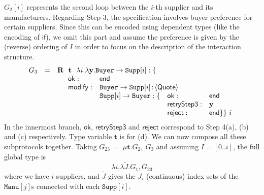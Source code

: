 \documentclass{LMCS}
\newcommand{\kf}[1]{\textup{\textsf{#1}}\xspace}
\newcommand{\RECSEQP}[4]{\ensuremath{\mathbf{R} \ #1\ \lambda #2.\lambda #3.#4}}
\newcommand{\ty}{\textbf{t}}
\newcommand{\End}{\kf{end}}
\newcommand{\ENCan}[1]{\langle #1 \rangle}
\newcommand{\TO}[2]{#1\to #2}
\newcommand{\GS}[3]{\TO{#1}{#2}\colon \!\ENCan{#3}}
\newcommand{\GR}[4]{\RECSEQP{#1}{#2}{#3}{#4}}
\newcommand{\GM}[2]{\mu #1.#2}
\newcommand{\ii}{\ensuremath{i}}
\newcommand{\jj}{\ensuremath{j}}
\newcommand{\yy}{\ensuremath{\mathbf{y}}}
\newcommand{\II}{\ensuremath{I}}
\newcommand{\VEC}{\tilde}
\newcommand{\MERGE}[1]{\ensuremath{#1}}
\begin{document}
\noindent
$G_2[i]$ represents the second loop between the $i$-th supplier and its
manufacturers.  
Regarding {\sc Step} 3,  
the specification involves buyer preference for certain suppliers.  
Since this can be encoded using dependent types 
(like the encoding of $\mathsf{if}$),
we omit this part and assume 
the preference is given by the (reverse) ordering of $\II$ in order to focus on the
description of the
interaction structure.
\[
\begin{array}{rcl}
G_3 & = & \GR{\ \ty\ }{i}{\yy}{} \TO{\texttt{Buyer}}{\texttt{Supp}[i]} : \{ \\
& & \quad \begin{array}{llll}
\mathsf{ok}: & \End \\
\mathsf{modify}: & \multicolumn{3}{l}{\GS{\texttt{Buyer}}{\texttt{Supp}[i]}{\mathsf{Quote}}} \\
& \TO{\texttt{Supp}[i]}{\texttt{Buyer}}: \{
&  \mathsf{ok}: & \End \\
&& \mathsf{retryStep3}: & \yy\\
&&  \mathsf{reject}: & \End\}\}\ \ii
\end{array}
\end{array}
\]
In the innermost branch, $\mathsf{ok}$, $\mathsf{retryStep3}$ and 
$\mathsf{reject}$ correspond to {\sc Step} 4(a), (b) and (c)
respectively. Type variable $\ty$ is for (d). 
We can now compose all these subprotocols together. Taking
$G_{23}\ =\ \GM{\ty}{\MERGE{G_2,\ G_3}}$ 
and assuming $\II=[0..i]$, the full global type is 
\[
\lambda i.\lambda \VEC{J}.\MERGE{G_1,G_{23}} 
\]
where we have $i$ suppliers, and $\VEC{J}$ gives the $J_i$ (continuous) index sets of the $\texttt{Manu}[\jj]$s connected with each $\texttt{Supp}[\ii]$. 
\end{document}
